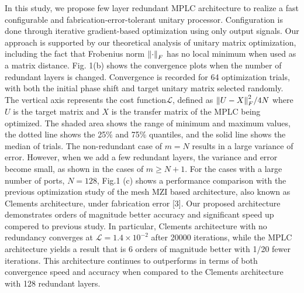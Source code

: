 \documentclass{article}
\begin{document}
In this study, we propose few layer redundant MPLC architecture to realize a fast configurable and fabrication-error-tolerant unitary processor. Configuration is done through iterative gradient-based optimization using only output signals. Our approach is supported by our theoretical analysis of unitary matrix optimization, including the fact that Frobenius norm $\norm{\cdot}_F$ has no local minimum when used as a matrix distance.
Fig. 1(b) shows the convergence plots when the number of redundant layers is changed. Convergence is recorded for 64 optimization trials, with both the initial phase shift and target unitary matrix selected randomly. The vertical axis represents the cost function$\mathcal{L}$, defined as $\norm{U-X}^2_F / 4N$ where $U$ is the target matrix and $X$ is the transfer matrix of the MPLC being optimized. The shaded area shows the range of minimum and maximum values, the dotted line shows the 25\% and 75\% quantiles, and the solid line shows the median of trials. The non-redundant case of $m=N$ results in a large variance of error. However, when we add a few redundant layers, the variance and error become small, as shown in the cases of $m \geq N+1$.
For the cases with a large number of ports, $N=128$, Fig.1 (c) shows a performance comparison with the previous optimization study of the mesh MZI based architecture, also known as Clements architecture, under fabrication error [3]. Our proposed architecture demonstrates orders of magnitude better accuracy and significant speed up compered to previous study. In particular, Clements architecture with no redundancy converges at $\mathcal{L}=1.4\times 10^{-2}$ after 20000 iterations, while the MPLC architecture yields a result that is 6 orders of magnitude better with 1/20 fewer iterations. This architecture continues to outperforms in terms of both convergence speed and accuracy when compared to the Clements architecture with 128 redundant layers.
\end{document}
